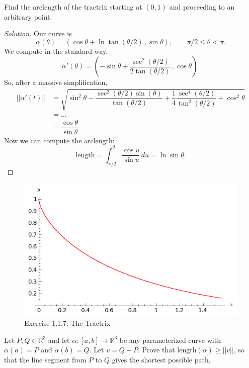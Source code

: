 \documentclass[Shifrin_Solutions_Spring_2018]{subfiles}
\begin{document}
\clearpage



\begin{exercise}
Find the arclength of the tractrix starting at $(0,1)$ and proceeding to an arbitrary point.
\end{exercise}

\begin{proof}[Solution]
Our curve is
\[
\alpha(\theta) = \left( \cos \theta + \ln \tan( \theta/2 )\, , \sin\theta \right) , 
\qquad \pi/2 \leq \theta < \pi .
\]
We compute in the standard way.
\[
\alpha'(\theta) = \left( -\sin\theta + \dfrac{\sec^2(\theta/2)}{2\tan(\theta/2)}\, , 
\cos\theta \right) .
\]
So, after a massive simplification,
\[
\begin{split}
||\alpha'(t) ||  & = \sqrt{  \sin^2\theta  -\dfrac{\sec^2(\theta/2)\sin(\theta)}{\tan(\theta/2)} 
+ \dfrac{1}{4}\dfrac{\sec^4(\theta/2)}{\tan^2(\theta/2)} + \cos^2\theta   } \\
& = \ldots \\
& =   \dfrac{\cos \theta}{\sin\theta}
\end{split}
\]
Now we can compute the arclength:
\[
\text{length} = \int_{\pi/2}^{\theta} \dfrac{\cos u}{\sin u} \, du = \ln \sin \theta .
\]
\end{proof}

\begin{figure}[h]
\centering
\includegraphics[width=.75\textwidth]{picturebook/ch1sec1/ex1-1-7}
\caption{Exercise 1.1.7: The Tractrix}
\end{figure}

\clearpage



\begin{exercise}
Let $P, Q \in \mathbb{R}^3$ and let $\alpha: [a,b] \rightarrow \mathbb{R}^3$ 
be any parameterized curve with $\alpha(a) = P$ and $\alpha(b) = Q$. Let 
$v= Q-P$. Prove that $\text{length}(\alpha) \geq ||v||$, so that the line 
segment from $P$ to $Q$ gives the shortest possible path.
\end{exercise}
\end{document}
